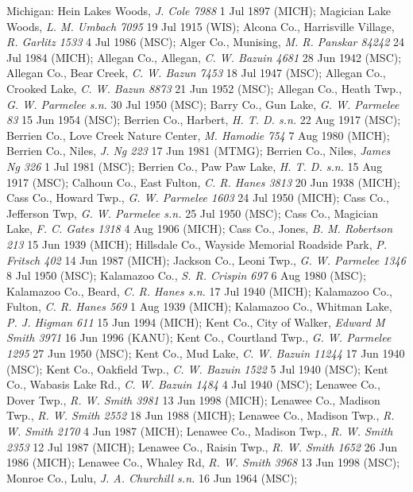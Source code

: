 \documentclass{article}
\begin{document}
Michigan:
Hein Lakes Woods, \textit{J. Cole 7988} 1 Jul 1897 (MICH);
 Magician Lake Woods, \textit{L. M. Umbach 7095} 19 Jul 1915 (WIS);
Alcona Co., Harrisville Village, \textit{R. Garlitz 1533} 4 Jul 1986 (MSC);
Alger Co., Munising, \textit{M. R. Panskar 84242} 24 Jul 1984 (MICH);
Allegan Co., Allegan, \textit{C. W. Bazuin 4681} 28 Jun 1942 (MSC);
Allegan Co., Bear Creek, \textit{C. W. Bazun 7453} 18 Jul 1947 (MSC);
Allegan Co., Crooked Lake, \textit{C. W. Bazun 8873} 21 Jun 1952 (MSC);
Allegan Co., Heath Twp., \textit{G. W. Parmelee s.n.} 30 Jul 1950 (MSC);
Barry Co., Gun Lake, \textit{G. W. Parmelee 83} 15 Jun 1954 (MSC);
Berrien Co., Harbert, \textit{H. T. D. s.n.} 22 Aug 1917 (MSC);
Berrien Co., Love Creek Nature Center, \textit{M. Hamodie 754} 7 Aug 1980 (MICH);
Berrien Co., Niles, \textit{J. Ng 223} 17 Jun 1981 (MTMG);
Berrien Co., Niles, \textit{James Ng 326} 1 Jul 1981 (MSC);
Berrien Co., Paw Paw Lake, \textit{H. T. D. s.n.} 15 Aug 1917 (MSC);
Calhoun Co., East Fulton, \textit{C. R. Hanes 3813} 20 Jun 1938 (MICH);
Cass Co., Howard Twp., \textit{G. W. Parmelee 1603} 24 Jul 1950 (MICH);
Cass Co., Jefferson Twp, \textit{G. W. Parmelee s.n.} 25 Jul 1950 (MSC);
Cass Co., Magician Lake, \textit{F. C. Gates 1318} 4 Aug 1906 (MICH);
Cass Co., Jones, \textit{B. M. Robertson 213} 15 Jun 1939 (MICH);
Hillsdale Co., Wayside Memorial Roadside Park, \textit{P. Fritsch 402} 14 Jun 1987 (MICH);
Jackson Co., Leoni Twp., \textit{G. W. Parmelee 1346} 8 Jul 1950 (MSC);
Kalamazoo Co., \textit{S. R. Crispin 697} 6 Aug 1980 (MSC);
Kalamazoo Co., Beard, \textit{C. R. Hanes s.n.} 17 Jul 1940 (MICH);
Kalamazoo Co., Fulton, \textit{C. R. Hanes 569} 1 Aug 1939 (MICH);
Kalamazoo Co., Whitman Lake, \textit{P. J. Higman 611} 15 Jun 1994 (MICH);
Kent Co., City of Walker, \textit{Edward M Smith 3971} 16 Jun 1996 (KANU);
Kent Co., Courtland Twp., \textit{G. W. Parmelee 1295} 27 Jun 1950 (MSC);
Kent Co., Mud Lake, \textit{C. W. Bazuin 11244} 17 Jun 1940 (MSC);
Kent Co., Oakfield Twp., \textit{C. W. Bazuin 1522} 5 Jul 1940 (MSC);
Kent Co., Wabasis Lake Rd., \textit{C. W. Bazuin 1484} 4 Jul 1940 (MSC);
Lenawee Co., Dover Twp., \textit{R. W. Smith 3981} 13 Jun 1998 (MICH);
Lenawee Co., Madison Twp., \textit{R. W. Smith 2552} 18 Jun 1988 (MICH);
Lenawee Co., Madison Twp., \textit{R. W. Smith 2170} 4 Jun 1987 (MICH);
Lenawee Co., Madison Twp., \textit{R. W. Smith 2353} 12 Jul 1987 (MICH);
Lenawee Co., Raisin Twp., \textit{R. W. Smith 1652} 26 Jun 1986 (MICH);
Lenawee Co., Whaley Rd, \textit{R. W. Smith 3968} 13 Jun 1998 (MSC);
Monroe Co., Lulu, \textit{J. A. Churchill s.n.} 16 Jun 1964 (MSC);
\end{document}
